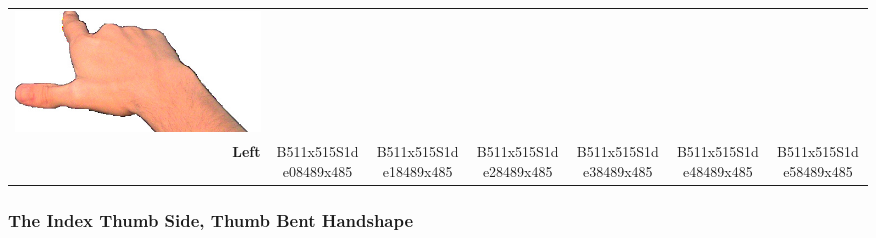 \documentclass{article}
\begin{document}
\begin{center}
\begin{tabular}{r*{6}{c}}
\includegraphics[scale=0.1]{images/09-03-6.jpg}\\
\textbf{Left}&
B511x515S1de08489x485&
B511x515S1de18489x485&
B511x515S1de28489x485&
B511x515S1de38489x485&
B511x515S1de48489x485&
B511x515S1de58489x485\\
\end{tabular}
\end{center}

\subsubsection{The Index Thumb Side, Thumb Bent Handshape}
\end{document}
